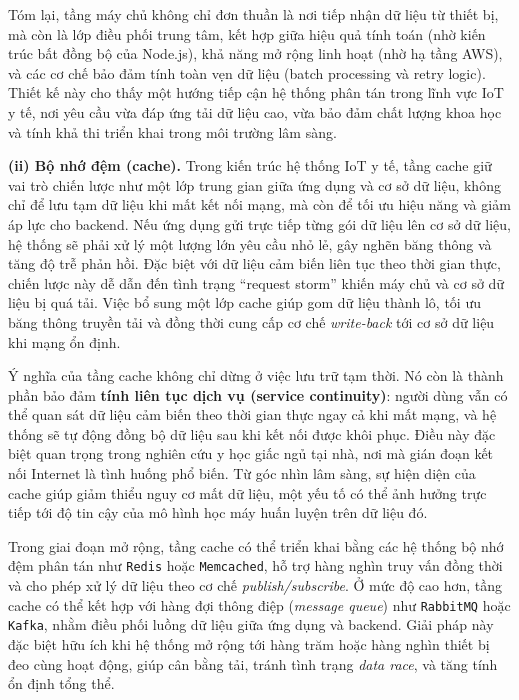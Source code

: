 Tóm lại, tầng máy chủ không chỉ đơn thuần là nơi tiếp nhận dữ liệu từ thiết bị, 
mà còn là lớp điều phối trung tâm, 
kết hợp giữa hiệu quả tính toán (nhờ kiến trúc bất đồng bộ của Node.js), 
khả năng mở rộng linh hoạt (nhờ hạ tầng AWS), 
và các cơ chế bảo đảm tính toàn vẹn dữ liệu (batch processing và retry logic). 
Thiết kế này cho thấy một hướng tiếp cận hệ thống phân tán trong lĩnh vực IoT y tế, 
nơi yêu cầu vừa đáp ứng tải dữ liệu cao, vừa bảo đảm chất lượng khoa học 
và tính khả thi triển khai trong môi trường lâm sàng.

\textbf{(ii) Bộ nhớ đệm (cache).} 
Trong kiến trúc hệ thống IoT y tế, tầng cache giữ vai trò chiến lược như một lớp 
trung gian giữa ứng dụng và cơ sở dữ liệu, không chỉ để lưu tạm dữ liệu khi mất kết nối 
mạng, mà còn để tối ưu hiệu năng và giảm áp lực cho backend. 
Nếu ứng dụng gửi trực tiếp từng gói dữ liệu lên cơ sở dữ liệu, hệ thống sẽ phải xử lý 
một lượng lớn yêu cầu nhỏ lẻ, gây nghẽn băng thông và tăng độ trễ phản hồi. 
Đặc biệt với dữ liệu cảm biến liên tục theo thời gian thực, chiến lược này dễ dẫn đến 
tình trạng “request storm” khiến máy chủ và cơ sở dữ liệu bị quá tải. 
Việc bổ sung một lớp cache giúp gom dữ liệu thành lô, 
tối ưu băng thông truyền tải và đồng thời cung cấp cơ chế \textit{write-back} 
tới cơ sở dữ liệu khi mạng ổn định. 

Ý nghĩa của tầng cache không chỉ dừng ở việc lưu trữ tạm thời. 
Nó còn là thành phần bảo đảm \textbf{tính liên tục dịch vụ (service continuity)}: 
người dùng vẫn có thể quan sát dữ liệu cảm biến theo thời gian thực ngay cả khi mất mạng, 
và hệ thống sẽ tự động đồng bộ dữ liệu sau khi kết nối được khôi phục. 
Điều này đặc biệt quan trọng trong nghiên cứu y học giấc ngủ tại nhà, 
nơi mà gián đoạn kết nối Internet là tình huống phổ biến. 
Từ góc nhìn lâm sàng, sự hiện diện của cache giúp giảm thiểu nguy cơ mất dữ liệu, 
một yếu tố có thể ảnh hưởng trực tiếp tới độ tin cậy của mô hình học máy huấn luyện trên dữ liệu đó.

Trong giai đoạn mở rộng, tầng cache có thể triển khai bằng các hệ thống bộ nhớ đệm phân tán như 
\texttt{Redis} hoặc \texttt{Memcached}, hỗ trợ hàng nghìn truy vấn đồng thời và cho phép 
xử lý dữ liệu theo cơ chế \textit{publish/subscribe}. 
Ở mức độ cao hơn, tầng cache có thể kết hợp với hàng đợi thông điệp (\textit{message queue}) 
như \texttt{RabbitMQ} hoặc \texttt{Kafka}, nhằm điều phối luồng dữ liệu giữa ứng dụng và backend. 
Giải pháp này đặc biệt hữu ích khi hệ thống mở rộng tới hàng trăm hoặc hàng nghìn thiết bị đeo cùng hoạt động, 
giúp cân bằng tải, tránh tình trạng \textit{data race}, và tăng tính ổn định tổng thể. 

